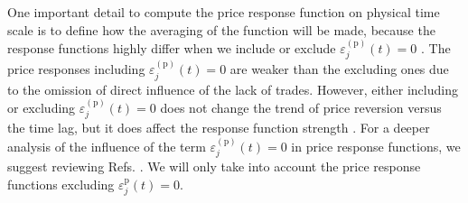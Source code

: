One important detail to compute the price response function on physical time
scale is to define how the averaging of the function will be made, because the
response functions highly differ when we include or exclude
$\varepsilon^{\left(\textrm{p}\right)}_j \left( t\right) = 0$
\cite{Wang_2016_cross}. The price responses including
$\varepsilon^{\left(\textrm{p}\right)}_j \left( t\right) = 0$ are weaker than
the excluding ones due to the omission of direct influence of the lack of
trades. However, either including or excluding
$\varepsilon^{\left(\textrm{p}\right)}_j \left( t\right) = 0$ does not change
the trend of price reversion versus the time lag, but it does affect the
response function strength \cite{Wang_2016_avg}. For a deeper analysis of the
influence of the term
$\varepsilon^{\left(\textrm{p}\right)}_j \left( t\right) = 0$ in price response
functions, we suggest reviewing Refs. \cite{Wang_2016_avg,Wang_2016_cross}. We
will only take into account the price response functions excluding
$\varepsilon^{\textrm{p}}_j \left( t\right) = 0$.

